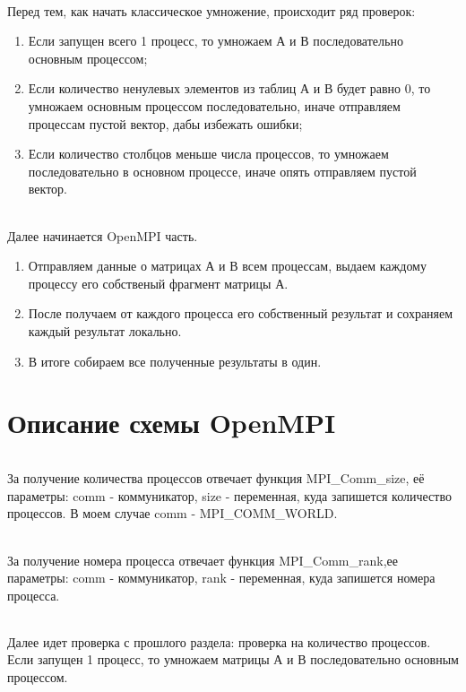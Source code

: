 \documentclass[12pt,a4paper]{article}
\begin{document}
\paragraph{}Перед тем, как начать классическое умножение, происходит ряд проверок:
\begin{enumerate} 
\item Если запущен всего 1 процесс, то умножаем А и В последовательно основным процессом;
\item Если количество ненулевых элементов из таблиц А и В будет равно 0, то умножаем основным процессом последовательно, иначе отправляем процессам пустой вектор, дабы избежать ошибки;
\item Если количество столбцов меньше числа процессов, то умножаем последовательно в основном процессе, иначе опять отправляем пустой вектор.
\end{enumerate} 
\paragraph{}
Далее начинается OpenMPI часть.
\begin{enumerate} 
\item Отправляем данные о матрицах А и В всем процессам, выдаем каждому процессу его собственый фрагмент матрицы А.
\item После получаем от каждого процесса его собственный результат и сохраняем каждый результат локально.
\item В итоге собираем все полученные результаты в один.
\end{enumerate} 

\part*{Описание схемы OpenMPI}
\paragraph{}За получение количества процессов отвечает функция MPI\_Comm\_size, её параметры: comm - коммуникатор, size - переменная, куда запишется количество процессов. В моем случае comm - MPI\_COMM\_WORLD.
\paragraph{}За получение номера процесса отвечает функция  MPI\_Comm\_rank,ее параметры: comm - коммуникатор, rank - переменная, куда запишется номера процесса.
\paragraph{}Далее идет проверка с прошлого раздела: проверка на количество процессов. Если запущен 1 процесс, то умножаем матрицы А и В последовательно основным процессом.
\end{document}
